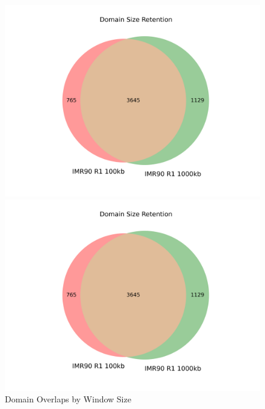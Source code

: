 \begin{figure}[thp]
  \caption{Domain Overlaps by Window Size}
  \begin{minipage}{0.45\textwidth}%
    \centering
    \includegraphics[width=\textwidth]{./figures/supplementary/domains/venn2_ir1_100kb_vs_ir1_1000kb.png}
  \end{minipage}

  \begin{minipage}{0.45\textwidth}
    \centering
    \includegraphics[width=\textwidth]{./figures/supplementary/domains/venn2_ir1_100kb_vs_ir1_1000kb.png}
  \end{minipage}
\end{figure}

